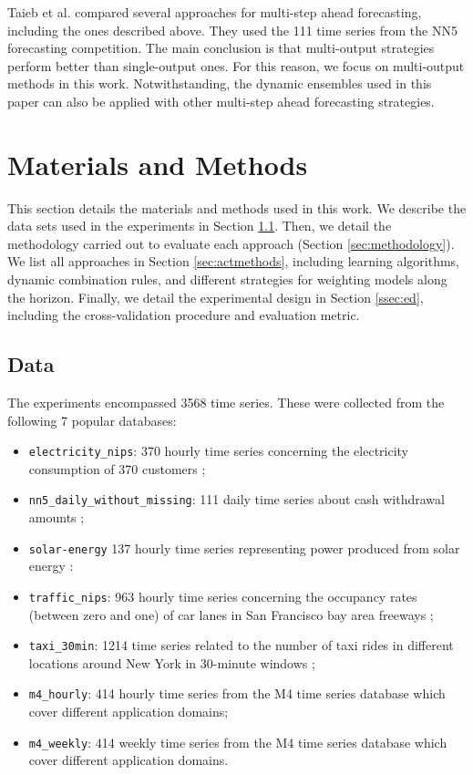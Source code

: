 \documentclass[smallcondensed]{svjour3}
\begin{document}
Taieb et al. \cite{taieb2012review} compared several approaches for multi-step ahead forecasting, including the ones described above. They used the 111 time series from the NN5 forecasting competition. 
The main conclusion is that multi-output strategies perform better than single-output ones.
For this reason, we focus on multi-output methods in this work. Notwithstanding, the dynamic ensembles used in this paper can also be applied with other multi-step ahead forecasting strategies.

\section{Materials and Methods}\label{sec:materialsmethods}

This section details the materials and methods used in this work. 
We describe the data sets used in the experiments in Section \ref{sec:data}.
Then, we detail the methodology carried out to evaluate each approach (Section \ref{sec:methodology}). We list all approaches in Section \ref{sec:actmethods}, including learning algorithms, dynamic combination rules, and different strategies for weighting models along the horizon. Finally, we detail the experimental design in Section \ref{ssec:ed}, including the cross-validation procedure and evaluation metric.

\subsection{Data}\label{sec:data}

The experiments encompassed 3568 time series. These were collected from the following 7 popular databases:
\begin{itemize}
    \item \texttt{electricity\_nips}: 370 hourly time series concerning the electricity consumption of 370 customers \cite{yu2015high}; 
    \item \texttt{nn5\_daily\_without\_missing}: 111 daily time series about cash withdrawal amounts \cite{taieb2012review};
    \item \texttt{solar-energy} 137 hourly time series representing power produced from solar energy \cite{lai2018modeling}:
    \item \texttt{traffic\_nips}: 963 hourly time series concerning the occupancy rates (between zero and one) of car lanes in San Francisco bay area freeways \cite{yu2015high};
    \item \texttt{taxi\_30min}: 1214 time series related to the number of taxi rides in different locations around New York in 30-minute windows \cite{borchert2022multi};
    \item \texttt{m4\_hourly}: 414 hourly time series from the M4 time series database \cite{makridakis2020m4} which cover different application domains;
    \item \texttt{m4\_weekly}: 414 weekly time series from the M4 time series database \cite{makridakis2020m4} which cover different application domains.
\end{itemize}
\end{document}
